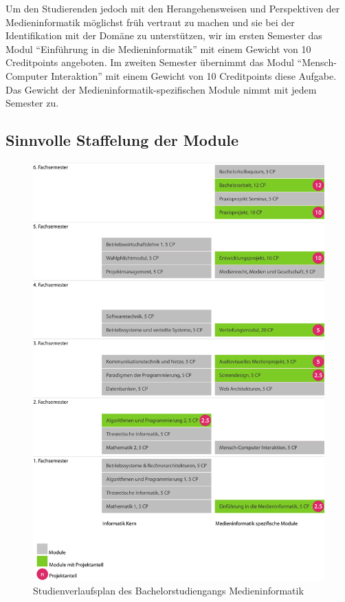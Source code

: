 Um den Studierenden jedoch mit den Herangehensweisen und Perspektiven
der Medieninformatik möglichst früh vertraut zu machen und sie bei der
Identifikation mit der Domäne zu unterstützen, wir im ersten Semester
das Modul ``Einführung in die Medieninformatik'' mit einem Gewicht von
10 Creditpoints angeboten. Im zweiten Semester übernimmt das Modul
``Mensch-Computer Interaktion'' mit einem Gewicht von 10 Creditpoints
diese Aufgabe. Das Gewicht der Medieninformatik-spezifischen Module
nimmt mit jedem Semester zu.

\subsection{Sinnvolle Staffelung der
Module}\label{sinnvolle-staffelung-der-module}

\begin{figure}[htbp]
\centering
\includegraphics[width=\columnwidth]{../anhaenge/bilder/ba-verlaufsplan.png}
\caption{Studienverlaufsplan des Bachelorstudiengangs Medieninformatik}
\end{figure}

